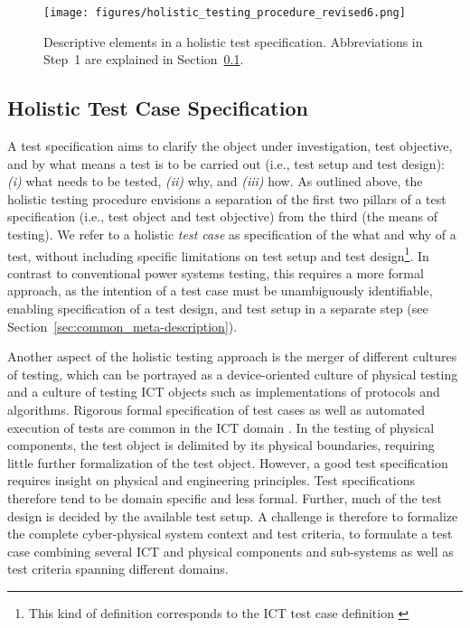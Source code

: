 \begin{figure}[!t]
\centering
\texttt{[image: figures/holistic\_testing\_procedure\_revised6.png]}%
\caption{Descriptive elements in a holistic test specification.
Abbreviations in Step~1 are explained in Section~\ref{sec:holistic_test_definition}.}
\label{fig:holistic_testing_revised}
\end{figure}


\subsection{Holistic Test Case Specification}
\label{sec:holistic_test_definition}
A test specification aims to clarify the object under investigation, test objective, and by what means a test is to be carried out (i.e., test setup and test design): \emph{(i)} what needs to be tested, \emph{(ii)} why, and \emph{(iii)} how.  %
As outlined above, the holistic testing procedure envisions a separation of the first two pillars of a test specification (i.e., test object and test objective) from the third (the means of testing). We refer to a holistic \emph{test case} as specification of the what and why of a test, without including specific limitations on test setup and test design\footnote{This kind of definition corresponds to the ICT test case definition \cite{baker2007}}.
In contrast to conventional power systems testing, this requires a more formal approach, as the intention of a test case must be unambiguously identifiable, enabling specification of a test design, and test setup in a separate step (see Section~\ref{sec:common_meta-description}).  

Another aspect of the holistic testing approach is the merger of different cultures of testing, which can be portrayed as a device-oriented culture of physical testing and a culture of testing ICT objects such as implementations of protocols and algorithms.
Rigorous formal specification of test cases as well as automated execution of tests are common in the ICT domain \cite{gnesi2012}. %
In the testing of physical components, the test object is delimited by its physical boundaries, requiring little further formalization of the test object. However, a good test specification requires insight on physical and engineering principles. Test specifications therefore tend to be domain specific and less formal. Further, much of the test design is decided by the available test setup. 
%
A challenge is therefore to formalize the complete cyber-physical system context and test criteria, to formulate a test case combining several ICT and physical components and sub-systems as well as test criteria spanning different domains.  

